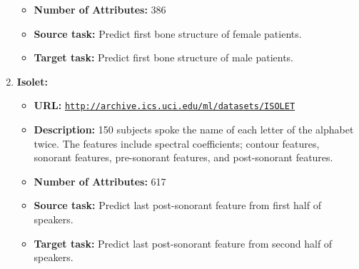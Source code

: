 \documentclass{article}
\begin{document}
\begin{enumerate}
\begin{itemize}
      \item \textbf{Number of Attributes:} 386
      \item \textbf{Source task:} Predict first bone structure of female patients.
      \item \textbf{Target task:} Predict first bone structure of male patients.
    \end{itemize}
  \item \textbf{Isolet:} 
    \begin{itemize}
      \item \textbf{URL:} \href{http://archive.ics.uci.edu/ml/datasets/ISOLET}{\texttt{http://archive.ics.uci.edu/ml/datasets/ISOLET}}
      \item \textbf{Description:} 150 subjects spoke the name of each letter of the alphabet twice. The features include spectral coefficients; contour features, sonorant features, pre-sonorant features, and post-sonorant features. 
      \item \textbf{Number of Attributes:} 617
      \item \textbf{Source task:} Predict last post-sonorant feature from first half of speakers. 
      \item \textbf{Target task:} Predict last post-sonorant feature from second half of speakers.
    \end{itemize}
\end{enumerate}
\end{document}
